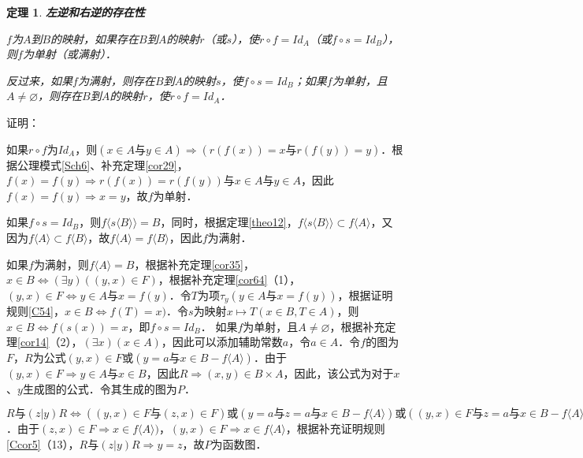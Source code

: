\documentclass[12pt, a4paper, oneside]{book}
\newtheorem{theo}{定理}
\begin{document}
			\begin{theo}\label{theo19}
				\textbf{左逆和右逆的存在性}
				\par
				$f$为$A$到$B$的映射，如果存在$B$到$A$的映射$r$（或$s$），使$r\circ f=Id_A$（或$f\circ s=Id_B$），则$f$为单射（或满射）．
				\par
				反过来，如果$f$为满射，则存在$B$到$A$的映射$s$，使$f\circ s=Id_B$；如果$f$为单射，且$A\neq \varnothing$，则存在$B$到$A$的映射$r$，使$r\circ f=Id_A$．
			\end{theo}
			证明：
			\par
			如果$r\circ f$为$Id_A$，则$(x\in A\text{与}y\in A)\Rightarrow (r(f(x))=x\text{与}r(f(y))=y)$．根据公理模式\ref{Sch6}、补充定理\ref{cor29}， $f(x)=f(y)\Rightarrow r(f(x))=r(f(y))\text{与}x\in A\text{与}y\in A$，因此$f(x)=f(y)\Rightarrow x=y$，故$f$为单射．
			\par
			如果$f\circ s=Id_B$，则$f\langle s\langle B \rangle \rangle=B$，同时，根据定理\ref{theo12}，$f\langle s\langle B \rangle \rangle\subset f\langle A \rangle $，又因为$f\langle A \rangle \subset f\langle B \rangle $，故$f\langle A \rangle =f\langle B \rangle $，因此$f$为满射．
			\par
			如果$f$为满射，则$f\langle A \rangle =B$，根据补充定理\ref{cor35}，$x\in B\Leftrightarrow (\exists y)((y, x)\in F)$，根据补充定理\ref{cor64}（1），$(y, x)\in F\Leftrightarrow y\in A\text{与}x=f(y)$．令$T$为项$\tau_y(y\in A\text{与}x=f(y))$，根据证明规则\ref{C54}，$x\in B\Leftrightarrow f(T)=x)$．令$s$为映射$x\mapsto T(x\in B, T\in A)$，则$x\in B\Leftrightarrow f(s(x))=x$，即$f\circ s=Id_B$．
			如果$f$为单射，且$A\neq \varnothing$，根据补充定理\ref{cor14}（2），$(\exists x)(x\in A)$，因此可以添加辅助常数$a$，令$a\in A$．令$f$的图为$F$，$R$为公式$(y, x)\in F\text{或}(y=a\text{与}x\in B-f\langle A \rangle )$．由于$(y, x)\in F\Rightarrow y\in A\text{与}x\in B$，因此$R\Rightarrow (x, y)\in B\times A$，因此，该公式为对于$x$、$y$生成图的公式．令其生成的图为$P$．
			\par
			$R\text{与}(z|y)R\Leftrightarrow ((y, x)\in F\text{与}(z, x)\in F)\text{或}(y=a\text{与}z=a\text{与}x\in B-f\langle A \rangle )\text{或}((y, x)\in F \text{与}z=a\text{与}x\in B-f\langle A \rangle )\text{或}((z, x)\in F \text{与}y=a\text{与}x\in B\text{与}x\notin f\langle A \rangle )$．$由于(z, x)\in F\Rightarrow x\in f\langle A \rangle )$，$(y, x)\in F\Rightarrow x\in f\langle A \rangle $，根据补充证明规则\ref{Ccor5}（13），$R\text{与}(z|y) R\Rightarrow y=z$，故$P$为函数图．
			\par
\end{document}

